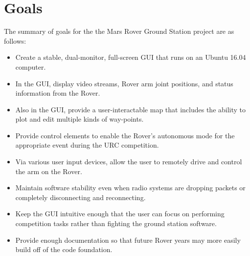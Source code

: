 \section{Goals}
The summary of goals for the the Mars Rover Ground Station project are as follows:

\begin{itemize}
\item Create a stable, dual-monitor, full-screen GUI that runs on an Ubuntu 16.04 computer.
\item In the GUI, display video streams, Rover arm joint positions, and status information from the Rover.
\item Also in the GUI, provide a user-interactable map that includes the ability to plot and edit multiple kinds of way-points.
\item Provide control elements to enable the Rover's autonomous mode for the appropriate event during the URC competition.
\item Via various user input devices, allow the user to remotely drive and control the arm on the Rover.
\item Maintain software stability even when radio systems are dropping packets or completely disconnecting and reconnecting.
\item Keep the GUI intuitive enough that the user can focus on performing competition tasks rather than fighting the ground station software.
\item Provide enough documentation so that future Rover years may more easily build off of the code foundation.
\end{itemize}